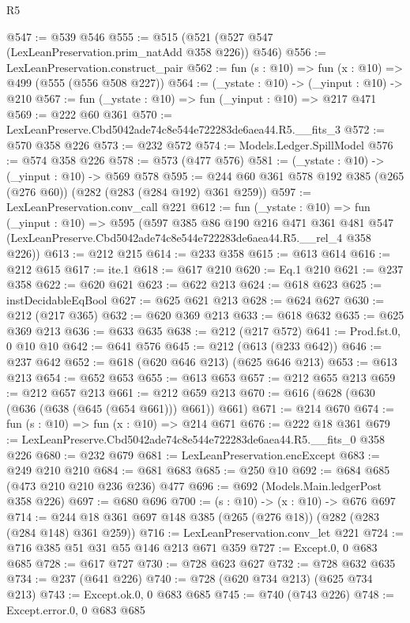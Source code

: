 \begin{lexlean}{R5}
\begin{coremodule}
@547 := @539 @546
@555 := @515 (@521 (@527 @547 (LexLeanPreservation.prim_natAdd @358 @226)) @546)
@556 := LexLeanPreservation.construct_pair
@562 := fun (s : @10) => fun (x : @10) => @499 (@555 (@556 @508 @227))
@564 := (_ystate : @10) -> (_yinput : @10) -> @210
@567 := fun (_ystate : @10) => fun (_yinput : @10) => @217 @471
@569 := @222 @60 @361
@570 := LexLeanPreserve.Cbd5042ade74c8e544e722283de6aea44.R5.__fits_3
@572 := @570 @358 @226
@573 := @232 @572
@574 := Models.Ledger.SpillModel
@576 := @574 @358 @226
@578 := @573 (@477 @576)
@581 := (_ystate : @10) -> (_yinput : @10) -> @569 @578
@595 := @244 @60 @361 @578 @192 @385 (@265 (@276 @60)) (@282 (@283 (@284 @192) @361 @259))
@597 := LexLeanPreservation.conv_call @221
@612 := fun (_ystate : @10) =>
  fun (_yinput : @10) =>
  @595
    (@597
      @385
      @86
      @190
      @216
      @471
      @361
      @481
      @547
      (LexLeanPreserve.Cbd5042ade74c8e544e722283de6aea44.R5.__rel_4 @358 @226))
@613 := @212 @215
@614 := @233 @358
@615 := @613 @614
@616 := @212 @615
@617 := ite.{1}
@618 := @617 @210
@620 := Eq.{1} @210
@621 := @237 @358
@622 := @620 @621
@623 := @622 @213
@624 := @618 @623
@625 := instDecidableEqBool
@627 := @625 @621 @213
@628 := @624 @627
@630 := @212 (@217 @365)
@632 := @620 @369 @213
@633 := @618 @632
@635 := @625 @369 @213
@636 := @633 @635
@638 := @212 (@217 @572)
@641 := Prod.fst.{0, 0} @10 @10
@642 := @641 @576
@645 := @212 (@613 (@233 @642))
@646 := @237 @642
@652 := @618 (@620 @646 @213) (@625 @646 @213)
@653 := @613 @213
@654 := @652 @653
@655 := @613 @653
@657 := @212 @655 @213
@659 := @212 @657 @213
@661 := @212 @659 @213
@670 := @616 (@628 (@630 (@636 (@638 (@645 (@654 @661))) @661)) @661)
@671 := @214 @670
@674 := fun (s : @10) => fun (x : @10) => @214 @671
@676 := @222 @18 @361
@679 := LexLeanPreserve.Cbd5042ade74c8e544e722283de6aea44.R5.__fits_0 @358 @226
@680 := @232 @679
@681 := LexLeanPreservation.encExcept
@683 := @249 @210 @210
@684 := @681 @683
@685 := @250 @10
@692 := @684 @685 (@473 @210 @210 @236 @236) @477
@696 := @692 (Models.Main.ledgerPost @358 @226)
@697 := @680 @696
@700 := (s : @10) -> (x : @10) -> @676 @697
@714 := @244 @18 @361 @697 @148 @385 (@265 (@276 @18)) (@282 (@283 (@284 @148) @361 @259))
@716 := LexLeanPreservation.conv_let @221
@724 := @716 @385 @51 @31 @55 @146 @213 @671 @359
@727 := Except.{0, 0} @683 @685
@728 := @617 @727
@730 := @728 @623 @627
@732 := @728 @632 @635
@734 := @237 (@641 @226)
@740 := @728 (@620 @734 @213) (@625 @734 @213)
@743 := Except.ok.{0, 0} @683 @685
@745 := @740 (@743 @226)
@748 := Except.error.{0, 0} @683 @685

\end{coremodule}
\end{lexlean}
